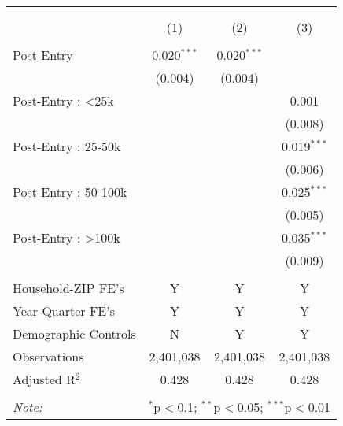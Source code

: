 
\begin{table}[!htbp] \centering 
  \caption{} 
  \label{} 
\begin{tabular}{@{\extracolsep{5pt}}lccc} 
\\[-1.8ex]\hline 
\hline \\[-1.8ex] 
\\[-1.8ex] & (1) & (2) & (3)\\ 
\hline \\[-1.8ex] 
 Post-Entry & 0.020$^{***}$ & 0.020$^{***}$ &  \\ 
  & (0.004) & (0.004) &  \\ 
  Post-Entry : <25k &  &  & 0.001 \\ 
  &  &  & (0.008) \\ 
  Post-Entry : 25-50k &  &  & 0.019$^{***}$ \\ 
  &  &  & (0.006) \\ 
  Post-Entry : 50-100k &  &  & 0.025$^{***}$ \\ 
  &  &  & (0.005) \\ 
  Post-Entry : >100k &  &  & 0.035$^{***}$ \\ 
  &  &  & (0.009) \\ 
 \hline \\[-1.8ex] 
Household-ZIP FE's & Y & Y & Y \\ 
Year-Quarter FE's & Y & Y & Y \\ 
Demographic Controls & N & Y & Y \\ 
Observations & 2,401,038 & 2,401,038 & 2,401,038 \\ 
Adjusted R$^{2}$ & 0.428 & 0.428 & 0.428 \\ 
\hline 
\hline \\[-1.8ex] 
\textit{Note:}  & \multicolumn{3}{l}{$^{*}$p$<$0.1; $^{**}$p$<$0.05; $^{***}$p$<$0.01} \\ 
\end{tabular} 
\end{table} 
